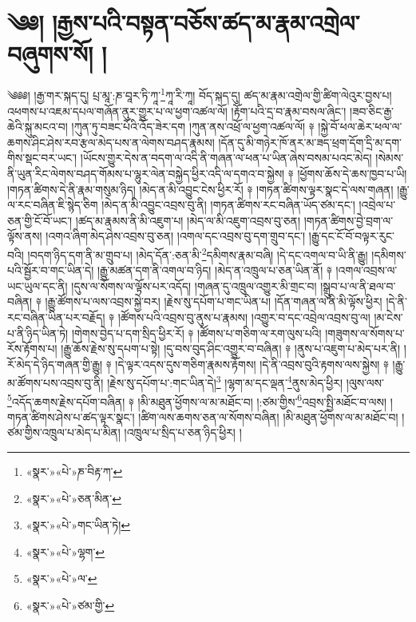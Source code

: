 \chapter{༄༅། །རྒྱས་པའི་བསྟན་བཅོས་ཚད་མ་རྣམ་འགྲེལ་བཞུགས་སོ། །}༄༅༅། །རྒྱ་གར་སྐད་དུ། པྲ་མཱ་:ཎ་བཱར་ཏི་ཀཱ་\footnote{«སྣར་»«པེ་»ཎ་བིརྟ་ཀ་}ཀཱ་རི་ཀཱ། བོད་སྐད་དུ། ཚད་མ་རྣམ་འགྲེལ་གྱི་ཚིག་ལེའུར་བྱས་པ། འཕགས་པ་འཇམ་དཔལ་གཞོན་ནུར་གྱུར་པ་ལ་ཕྱག་འཚལ་ལོ། །རྟོག་པའི་དྲ་བ་རྣམ་བསལ་ཞིང་། །ཟབ་ཅིང་རྒྱ་ཆེའི་སྐུ་མངའ་བ། །ཀུན་ཏུ་བཟང་པོའི་འོད་ཟེར་དག །ཀུན་ནས་འཕྲོ་ལ་ཕྱག་འཚལ་ལོ། ༈ །སྐྱེ་བོ་ཕལ་ཆེར་ཕལ་ལ་ཆགས་ཤིང་ཤེས་རབ་རྩལ་མེད་པས་ན་ལེགས་བཤད་རྣམས། །དོན་དུ་མི་གཉེར་ཁོ་ནར་མ་ཟད་ཕྲག་དོག་དྲི་མ་དག་གིས་སྡང་བར་ཡང་། །ཡོངས་གྱུར་དེས་ན་བདག་ལ་འདི་ནི་གཞན་ལ་ཕན་པ་ཡིན་ཞེས་བསམ་པའང་མེད། །སེམས་ནི་ཡུན་རིང་ལེགས་བཤད་གོམས་པ་ལྷུར་ལེན་བསྐྱེད་ཕྱིར་འདི་ལ་དགའ་བ་སྐྱེས། ༈ །ཕྱོགས་ཆོས་དེ་ཆས་ཁྱབ་པ་ཡི། །གཏན་ཚིགས་དེ་ནི་རྣམ་གསུམ་ཉིད། །མེད་ན་མི་འབྱུང་ངེས་ཕྱིར་རོ། ༈ །གཏན་ཚིགས་ལྟར་སྣང་དེ་ལས་གཞན། །རྒྱུ་ལ་རང་བཞིན་ཇི་སྙེད་ཅིག །མེད་ན་མི་འབྱུང་འབྲས་བུ་ནི། །གཏན་ཚིགས་རང་བཞིན་ཡོད་ཙམ་དང་། །འབྲེལ་པ་ཅན་གྱི་ངོ་བོ་ཡང་། །ཚད་མ་རྣམས་ནི་མི་འཇུག་པ། །མེད་ལ་མི་འཇུག་འབྲས་བུ་ཅན། །གཏན་ཚིགས་བྱེ་བྲག་ལ་ལྟོས་ནས། །འགའ་ཞིག་མེད་ཤེས་འབྲས་བུ་ཅན། །འགལ་དང་འབྲས་བུ་དག་གྲུབ་དང་། །རྒྱུ་དང་ངོ་བོ་བལྟར་རུང་བའི། །བདག་ཉིད་དག་ནི་མ་གྲུབ་པ། །མེད་དོན་:ཅན་མི་\footnote{«སྣར་»«པེ་»ཅན་མིན་}དམིགས་རྣམ་བཞི། །དེ་དང་འགལ་བ་ཡི་ནི་རྒྱུ། །དམིགས་པའི་སྦྱོར་བ་གང་ཡིན་དེ། །རྒྱུ་མཚན་དག་ནི་འགལ་བ་ཉིད། །མེད་ན་འཁྲུལ་པ་ཅན་ཡིན་ནོ། ༈ །འགལ་འབྲས་ལ་ཡང་ཡུལ་དང་ནི། །དུས་ལ་སོགས་ལ་ལྟོས་པར་འདོད། །གཞན་དུ་འཁྲུལ་འགྱུར་མི་གྲང་བ། །སྒྲུབ་པ་ལ་ནི་ཐལ་བ་བཞིན། ༈ །རྒྱུ་ཚོགས་པ་ལས་འབྲས་སྐྱེ་བར། །རྗེས་སུ་དཔོག་པ་གང་ཡིན་པ། །དོན་གཞན་ལ་ནི་མི་ལྟོས་ཕྱིར། །དེ་ནི་རང་བཞིན་ཡིན་པར་བརྗོད། ༈ །ཚོགས་པའི་འབྲས་བུ་ནུས་པ་རྣམས། །འགྱུར་བ་དང་འབྲེལ་འབྲས་བུ་ལ། །མ་ངེས་པ་ནི་ཉིད་ཡིན་ཏེ། །གེགས་བྱེད་པ་དག་སྲིད་ཕྱིར་རོ། ༈ །ཚོགས་པ་གཅིག་ལ་རག་ལུས་པའི། །གཟུགས་ལ་སོགས་པ་རོས་རྟོགས་པ། །རྒྱུ་ཆོས་རྗེས་སུ་དཔག་པ་སྟེ། །དུ་བས་བུད་ཤིང་འགྱུར་བ་བཞིན། ༈ །ནུས་པ་འཇུག་པ་མེད་པར་ནི། །རོ་མེད་དེ་ཉིད་གཞན་གྱི་རྒྱུ། ༈ །དེ་ལྟར་འདས་དུས་གཅིག་རྣམས་རྟོགས། །དེ་ནི་འབྲས་བུའི་རྟགས་ལས་སྐྱེས། ༈ །རྒྱུ་མ་ཚོགས་པས་འབྲས་བུ་ནི། །རྗེས་སུ་དཔོག་པ་:གང་ཡིན་དེ།\footnote{«སྣར་»«པེ་»གང་ཡིན་ཏེ།} །ལྷག་མ་དང་ལྡན་\footnote{«སྣར་»«པེ་»ལྷག་}ནུས་མེད་ཕྱིར། །ལུས་ལས་\footnote{«སྣར་»«པེ་»ལ་}འདོད་ཆགས་རྗེས་དཔོག་བཞིན། ༈ །མི་མཐུན་ཕྱོགས་ལ་མ་མཐོང་བ། །:ཙམ་གྱིས་\footnote{«སྣར་»«པེ་»ཙམ་གྱི་}འབྲས་སྤྱི་མཐོང་བ་ལས། །གཏན་ཚིགས་ཤེས་པ་ཚད་ལྟར་སྣང་། །ཚིག་ལས་ཆགས་ཅན་ལ་སོགས་བཞིན། །མི་མཐུན་ཕྱོགས་ལ་མ་མཐོང་བ། །ཙམ་གྱིས་འཁྲུལ་པ་མེད་པ་མིན། །འཁྲུལ་པ་སྲིད་པ་ཅན་ཉིད་ཕྱིར། །
